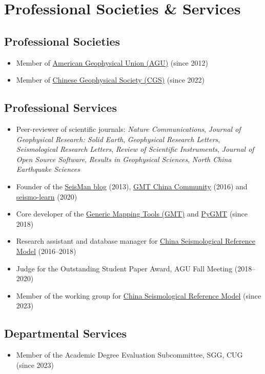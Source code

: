 \section{Professional Societies \& Services}

\subsection{Professional Societies}
\begin{itemize}
\item Member of \href{https://sites.agu.org/}{American Geophysical Union (AGU)} (since 2012)
\item Member of \href{http://www.cgscgs.org.cn/}{Chinese Geophysical Society (CGS)} (since 2022)
\end{itemize}

\subsection{Professional Services}
\begin{itemize}
\item Peer-reviewer of scientific journals:
      \emph{Nature Communications},
      \emph{Journal of Geophysical Research: Solid Earth},
      \emph{Geophysical Research Letters},
      \emph{Seismological Research Letters},
      \emph{Review of Scientific Instruments},
      \emph{Journal of Open Source Software},
      \emph{Results in Geophysical Sciences},
      \emph{North China Earthquake Sciences}
\item Founder of the \href{https://blog.seisman.info}{SeisMan blog} (2013),
      \href{http://gmt-china.org/}{GMT China Community} (2016)
      and \href{https://seismo-learn.org/}{seismo-learn} (2020)
\item Core developer of the \href{https://github.com/GenericMappingTools/gmt}{Generic Mapping Tools (GMT)} and
      \href{https://github.com/GenericMappingTools/pygmt}{PyGMT} (since 2018)
\item Research assistant and database manager for \href{http://chinageorefmodel.org/}{China Seismological Reference Model} (2016--2018)
\item Judge for the Outstanding Student Paper Award, AGU Fall Meeting (2018--2020)
\item Member of the working group for \href{http://chinageorefmodel.org/}{China Seismological Reference Model} (since 2023)
\end{itemize}

\subsection{Departmental Services}
\begin{itemize}
\item Member of the Academic Degree Evaluation Subcommittee, SGG, CUG (since 2023)
\end{itemize}
